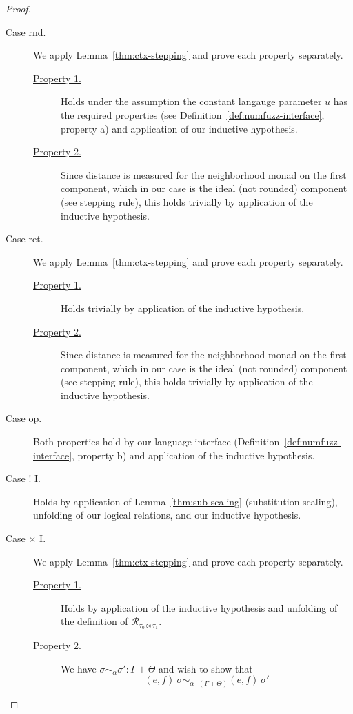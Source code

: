 \begin{proof}
\begin{description}
    \item[Case rnd.] 
      We apply Lemma~\ref{thm:ctx-stepping} and prove each property separately.
      \begin{description}
        \item[\underline{Property 1.}]
          Holds under the assumption the constant langauge parameter $u$ has the
          required properties (see Definition~\ref{def:numfuzz-interface},
          property a) and application of our inductive hypothesis.
        \item[\underline{Property 2.}]
          Since distance is measured for the neighborhood monad on the first
          component, which in our case is the ideal (not rounded) component (see
          stepping rule), this holds trivially by application of the inductive
          hypothesis.
      \end{description}

    \item[Case ret.] 
      We apply Lemma~\ref{thm:ctx-stepping} and prove each property separately.
      \begin{description}
        \item[\underline{Property 1.}]
          Holds trivially by application of the inductive hypothesis.
        \item[\underline{Property 2.}]
          Since distance is measured for the neighborhood monad on the first
          component, which in our case is the ideal (not rounded) component (see
          stepping rule), this holds trivially by application of the inductive
          hypothesis.
      \end{description}

    \item[Case op.] 
      Both properties hold by our language interface
      (Definition~\ref{def:numfuzz-interface}, property b) and application of
      the inductive hypothesis.

    \item[Case ! I.] Holds by application of Lemma~\ref{thm:sub-scaling}
      (substitution scaling), unfolding of our logical relations, and our
      inductive hypothesis.

    \item[Case $\times$ I.] 
      We apply Lemma~\ref{thm:ctx-stepping} and prove each property separately.
      \begin{description}
        \item[\underline{Property 1.}]
          Holds by application of the inductive hypothesis and unfolding of the
          definition of $\mathcal{R}_{\tau_0 \otimes \tau_1}$.
        \item[\underline{Property 2.}]
          We have 
          $\sigma \sim_{\alpha} \sigma' : \Gamma + \Theta$ 
          and wish to show that
          $$(e, f)~\sigma \sim_{\alpha \cdot (\Gamma + \Theta)} (e, f)~\sigma'$$


\end{description}
\end{description}
\end{proof}
